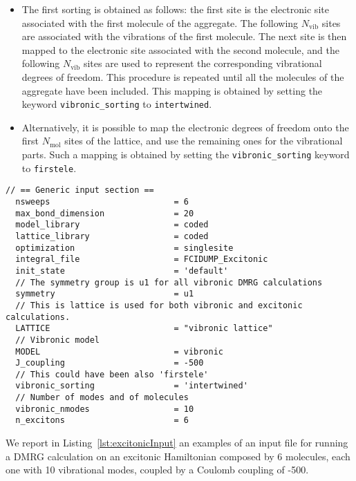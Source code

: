 \documentclass[bibliography=totoc,12pt,a4paper]{scrartcl}
\begin{document}
\begin{itemize}
  \item The first sorting is obtained as follows: the first site is the electronic site associated with the first molecule of the aggregate. The following $N_\text{vib}$ sites are associated with the vibrations of the first molecule. The next site is then mapped to the electronic site associated with the second molecule, and the following $N_\text{vib}$ sites are used to represent the corresponding vibrational degrees of freedom. This procedure is repeated until all the molecules of the aggregate have been included. This mapping is obtained by setting the keyword \texttt{vibronic\_sorting} to \texttt{intertwined}.
  \item Alternatively, it is possible to map the electronic degrees of freedom onto the first $N_\text{mol}$ sites of the lattice, and use the remaining ones for the vibrational parts.
  Such a mapping is obtained by setting the \texttt{vibronic\_sorting} keyword to \texttt{firstele}.
\end{itemize}

\begin{lstlisting}[language=qcmaquis,
				   caption={Input example for an excitonic DMRG calculation},
				   label=lst:excitonicInput]
  // == Generic input section ==
  nsweeps                         = 6
  max_bond_dimension              = 20
  model_library                   = coded
  lattice_library                 = coded
  optimization                    = singlesite
  integral_file                   = FCIDUMP_Excitonic
  init_state                      = 'default'
  // The symmetry group is u1 for all vibronic DMRG calculations
  symmetry                        = u1
  // This is lattice is used for both vibronic and excitonic calculations.
  LATTICE                         = "vibronic lattice" 
  // Vibronic model
  MODEL                           = vibronic
  J_coupling                      = -500
  // This could have been also 'firstele'
  vibronic_sorting                = 'intertwined'
  // Number of modes and of molecules
  vibronic_nmodes                 = 10
  n_excitons                      = 6
\end{lstlisting}

We report in Listing~\ref{lst:excitonicInput} an examples of an input file for running a DMRG calculation on an excitonic Hamiltonian composed by 6 molecules, each one with 10 vibrational modes, coupled by a Coulomb coupling of -500.
\end{document}
